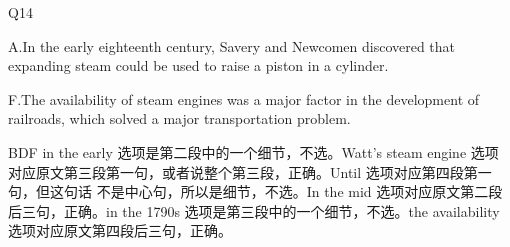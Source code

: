 \begin{blk}
    \begin{qst}
        Q14
    \end{qst}

    \begin{chc}
        A.In the early eighteenth century, Savery and Newcomen discovered that expanding steam could be used to raise a piston in a cylinder.

        F.The availability of steam engines was a major factor in the development of railroads, which solved a major transportation problem.
    \end{chc}

    \begin{nlz}
        BDF in the early 选项是第二段中的一个细节，不选。Watt’s steam engine 选项对应原文第三段第一句，或者说整个第三段，正确。Until 选项对应第四段第一句，但这句话 不是中心句，所以是细节，不选。In the mid 选项对应原文第二段后三句，正确。in the 1790s 选项是第三段中的一个细节，不选。the availability 选项对应原文第四段后三句，正确。
    \end{nlz}
\end{blk}